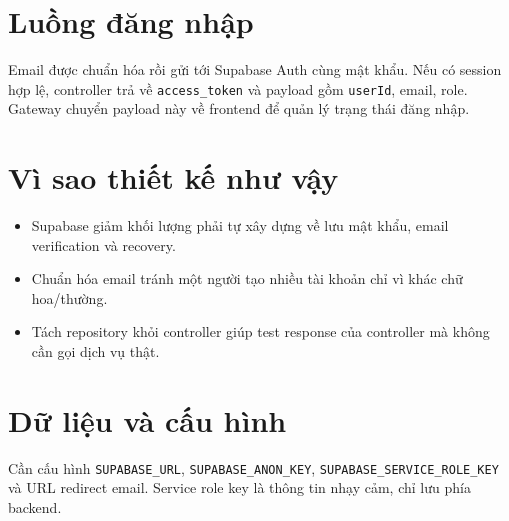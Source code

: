 \documentclass[12pt]{article}
\begin{document}
\section{Luồng đăng nhập}
Email được chuẩn hóa rồi gửi tới Supabase Auth cùng mật khẩu. Nếu có session hợp lệ, controller trả về \texttt{access\_token} và payload gồm \texttt{userId}, email, role. Gateway chuyển payload này về frontend để quản lý trạng thái đăng nhập.

\section{Vì sao thiết kế như vậy}
\begin{itemize}
  \item Supabase giảm khối lượng phải tự xây dựng về lưu mật khẩu, email verification và recovery.
  \item Chuẩn hóa email tránh một người tạo nhiều tài khoản chỉ vì khác chữ hoa/thường.
  \item Tách repository khỏi controller giúp test response của controller mà không cần gọi dịch vụ thật.
\end{itemize}

\section{Dữ liệu và cấu hình}
Cần cấu hình \texttt{SUPABASE\_URL}, \texttt{SUPABASE\_ANON\_KEY}, \texttt{SUPABASE\_SERVICE\_ROLE\_KEY} và URL redirect email. Service role key là thông tin nhạy cảm, chỉ lưu phía backend.
\end{document}
